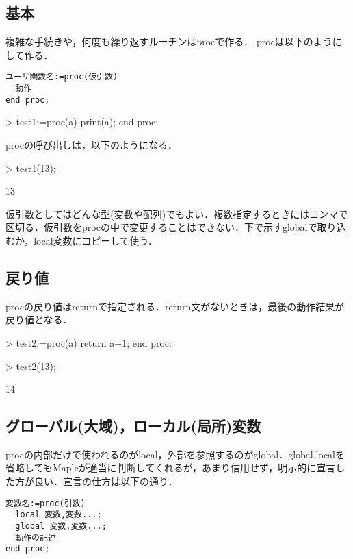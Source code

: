 \subsection{基本}
複雑な手続きや，何度も繰り返すルーチンはprocで作る．
procは以下のようにして作る．
\begin{verbatim}
ユーザ関数名:=proc(仮引数)
  動作
end proc;
\end{verbatim}
\begin{MapleInput}
> test1:=proc(a) 
    print(a); 
  end proc:
\end{MapleInput}
procの呼び出しは，以下のようになる．
\begin{MapleInput}
> test1(13);
\end{MapleInput}
\begin{MapleOutput}
13
\end{MapleOutput}
仮引数としてはどんな型(変数や配列)でもよい．複数指定するときにはコンマで区切る．仮引数をprocの中で変更することはできない．下で示すglobalで取り込むか，local変数にコピーして使う．

\subsection{戻り値}
procの戻り値はreturnで指定される．return文がないときは，最後の動作結果が戻り値となる．
\begin{MapleInput}
> test2:=proc(a) 
    return a+1; 
  end proc:
\end{MapleInput}
\begin{MapleInput}
> test2(13);
\end{MapleInput}
\begin{MapleOutput}
14
\end{MapleOutput}

\subsection{グローバル(大域)，ローカル(局所)変数}
procの内部だけで使われるのがlocal，外部を参照するのがglobal．global,localを省略してもMapleが適当に判断してくれるが，あまり信用せず，明示的に宣言した方が良い．宣言の仕方は以下の通り．
\begin{verbatim}
変数名:=proc(引数)
  local 変数,変数...;
  global 変数,変数...;
  動作の記述
end proc;
\end{verbatim}